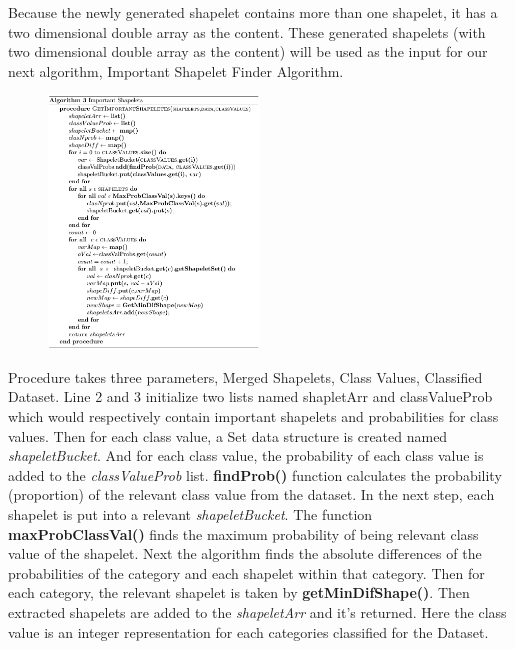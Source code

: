\documentclass[letterpaper, 10 pt, conference]{IEEEtran}  %
\begin{document}
Because the newly generated shapelet contains more than one shapelet, it has a two dimensional double array as the content. These generated shapelets (with two dimensional double array as the content) will be used as the input for our next algorithm, Important Shapelet Finder Algorithm. 


\begin{figure}[h!]
\includegraphics[width=0.5\textwidth]{algo3.png}
\end{figure}

Procedure takes three parameters, Merged Shapelets, Class Values, Classified Dataset. Line 2 and 3 initialize two lists named shapletArr and classValueProb which would respectively contain important shapelets and probabilities for class values. Then for each class value, a Set data structure is created named \textit{shapeletBucket}. And for each class value, the probability of each class value is added to the \textit{classValueProb} list. \textbf{findProb()} function calculates the probability (proportion) of the relevant class value from the dataset. In the next step, each shapelet is put into a relevant \textit{shapeletBucket}. The function \textbf{maxProbClassVal()} finds the maximum probability of being relevant class value of the shapelet. Next the algorithm finds the absolute differences of the probabilities of the category and each shapelet within that category. Then for each category, the relevant shapelet is taken by \textbf{getMinDifShape()}. Then extracted shapelets are added to the \textit{shapeletArr} and it’s returned. Here the class value is an integer representation for each categories classified for the Dataset.
\end{document}
